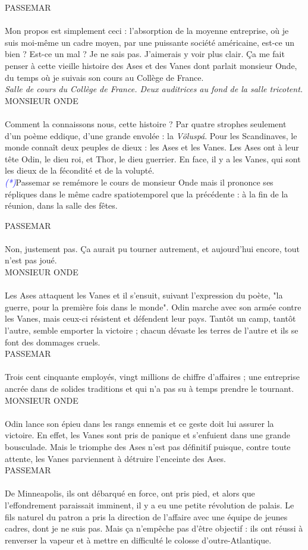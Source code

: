 \documentclass[a4paper]{report}
\newcounter{rem}[chapter]
\newcounter{sol}[chapter]
\newcommand{\annot}[1]{{\footnotesize \textcolor{blue}{\textit{(#1)}}}}
\newcommand{\repl}[2]{\uppercase{#1}\\\\#2\\}
\newcommand{\didas}[1]{\textit{#1}\\}
\begin{document}
\repl{Passemar}{Mon propos est simplement ceci : l'absorption de la moyenne entreprise, où je suis moi-même un cadre moyen, par une puissante société américaine, est-ce un bien ? Est-ce un mal ? Je ne sais pas. J'aimerais y voir plus clair. Ça me fait penser à cette vieille histoire des Ases et des Vanes dont parlait monsieur Onde, du temps où je suivais son cours au Collège de France.}

\didas{Salle de cours du Collège de France. Deux auditrices au fond de la salle tricotent.}

\repl{Monsieur Onde}{Comment la connaissons nous, cette histoire ? Par quatre strophes seulement d'un poème eddique, d'une grande envolée : la \textit{Völuspá}. Pour les Scandinaves, le monde connaît deux peuples de dieux : les Ases et les Vanes. Les Ases ont à leur tête Odin, le dieu roi, et Thor, le dieu guerrier. En face, il y a les Vanes, qui sont les dieux de la fécondité et de la volupté.}

\annot*{Passemar se remémore le cours de monsieur Onde mais il prononce ses répliques dans le même cadre spatiotemporel que la précédente : à la fin de la réunion, dans la salle des fêtes.}

\repl{Passemar}{Non, justement pas. Ça aurait pu tourner autrement, et aujourd'hui encore, tout n'est pas joué.}

\repl{Monsieur Onde}{Les Ases attaquent les Vanes et il s'ensuit, suivant l'expression du poète, "la guerre, pour la première fois dans le monde". Odin marche avec son armée contre les Vanes, mais ceux-ci résistent et défendent leur pays. Tantôt un camp, tantôt l'autre, semble emporter la victoire ; chacun dévaste les terres de l'autre et ils se font des dommages cruels.}

\repl{Passemar}{Trois cent cinquante employés, vingt millions de chiffre d'affaires ; une entreprise ancrée dans de solides traditions et qui n'a pas su à temps prendre le tournant.}

\repl{Monsieur Onde}{Odin lance son épieu dans les rangs ennemis et ce geste doit lui assurer la victoire. En effet, les Vanes sont pris de panique et s'enfuient dans une grande bousculade. Mais le triomphe des Ases n'est pas définitif puisque, contre toute attente, les Vanes parviennent à détruire l'enceinte des Ases.}

\repl{Passemar}{De Minneapolis, ils ont débarqué en force, ont pris pied, et alors que l'effondrement paraissait imminent, il y a eu une petite révolution de palais. Le fils naturel du patron a pris la direction de l'affaire avec une équipe de jeunes cadres, dont je ne suis pas. Mais ça n'empêche pas d'être objectif : ils ont réussi à renverser la vapeur et à mettre en difficulté le colosse d'outre-Atlantique.}
\end{document}
